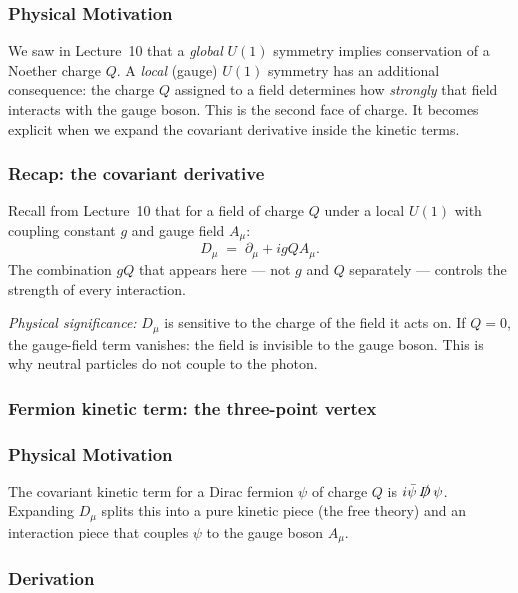\documentclass[../main.tex]{subfiles}
\begin{document}
\subsubsection*{Physical Motivation}

We saw in Lecture~10 that a \emph{global} $U(1)$ symmetry implies conservation of a Noether charge $Q$.  A \emph{local} (gauge) $U(1)$ symmetry has an additional consequence: the charge $Q$ assigned to a field determines how \emph{strongly} that field interacts with the gauge boson.  This is the second face of charge.  It becomes explicit when we expand the covariant derivative inside the kinetic terms.

\subsubsection*{Recap: the covariant derivative}

Recall from Lecture~10 that for a field of charge $Q$ under a local $U(1)$ with coupling constant $g$ and gauge field $A_\mu$:
\begin{equation}
  \boxed{D_\mu \;=\; \partial_\mu + ig Q A_\mu.}
  \label{eq:lec11:cov-deriv}
\end{equation}
The combination $gQ$ that appears here — not $g$ and $Q$ separately — controls the strength of every interaction.

\textit{Physical significance:} $D_\mu$ is sensitive to the charge of the field it acts on.  If $Q=0$, the gauge-field term vanishes: the field is invisible to the gauge boson.  This is why neutral particles do not couple to the photon.

\subsubsection*{Fermion kinetic term: the three-point vertex}

\subsubsection*{Physical Motivation}

The covariant kinetic term for a Dirac fermion $\psi$ of charge $Q$ is $i\bar\psi\,\slashed{D}\,\psi$.  Expanding $D_\mu$ splits this into a pure kinetic piece (the free theory) and an interaction piece that couples $\psi$ to the gauge boson $A_\mu$.

\subsubsection*{Derivation}
\end{document}
